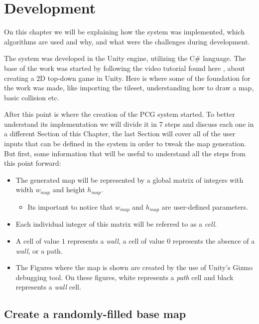 \chapter{Development}
\label{chapter:dev}

On this chapter we will be explaining how the system was implemented, which algorithms are used and why, and what were the challenges during development.

The system was developed in the Unity engine, utilizing the C\# language. The base of the work was started by following the video tutorial found here \cite{taft:2019}, about creating a 2D top-down game in Unity. Here is where some of the foundation for the work was made, like importing the tileset, understanding how to draw a map, basic collision etc.

After this point is where the creation of the PCG system started. To better understand its implementation we will divide it in 7 steps and discuss each one in a different Section of this Chapter, the last Section will cover all of the user inputs that can be defined in the system in order to tweak the map generation. But first, some information that will be useful to understand all the steps from this point forward: 
\begin{itemize}
    \item The generated map will be represented by a global matrix of integers with width \(w_{map}\) and height \(h_{map}\).
    \begin{itemize}
        \item Its important to notice that \(w_{map}\) and \(h_{map}\) are user-defined parameters.
    \end{itemize}
    \item Each individual integer of this matrix will be referred to as a \emph{cell}.
    \item A cell of value \(1\) represents a \emph{wall}, a cell of value \(0\) represents the absence of a \emph{wall}, or a path.
    \item The Figures where the map is shown are created by the use of Unity's Gizmo debugging tool. On these figures, white represents a \emph{path} cell and black represents a \emph{wall} cell.
\end{itemize}

\section{Create a randomly-filled base map}

